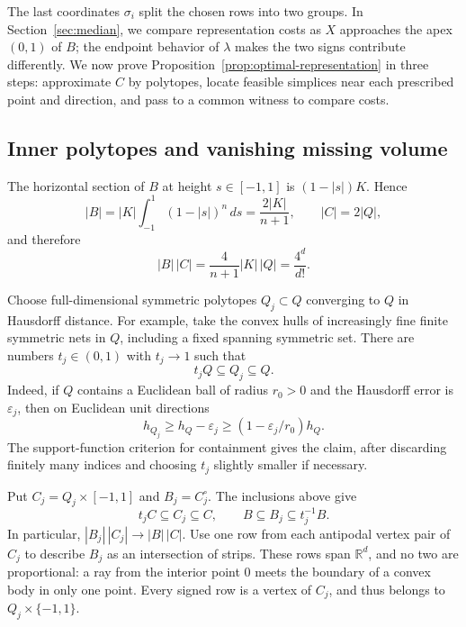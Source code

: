 The last coordinates $\sigma_i$ split the chosen rows into two groups.
In Section~\ref{sec:median}, we compare representation costs as $X$ approaches
the apex $(0,1)$ of $B$; the endpoint behavior of $\lambda$ makes the
two signs contribute differently. We now prove
Proposition~\ref{prop:optimal-representation} in three steps: approximate
$C$ by polytopes, locate feasible simplices near each prescribed point
and direction, and pass to a common witness to compare costs.

\subsection{Inner polytopes and vanishing missing volume}

The horizontal section of $B$ at height $s\in[-1,1]$ is
$(1-|s|)K$. Hence
\[
 |B|=|K|\int_{-1}^1(1-|s|)^n\,ds
     =\frac{2|K|}{n+1},
 \qquad |C|=2|Q|,
\]
and therefore
\begin{equation}\label{eq:lift-equality}
 |B|\,|C|=\frac4{n+1}|K|\,|Q|=\frac{4^d}{d!}.
\end{equation}

Choose full-dimensional symmetric polytopes $Q_j\subset Q$
converging to $Q$ in Hausdorff distance. For example, take the convex
hulls of increasingly fine finite symmetric nets in $Q$, including
a fixed spanning symmetric set. There are numbers $t_j\in(0,1)$
with $t_j\to1$ such that
\[
 t_jQ\subseteq Q_j\subseteq Q.
\]
Indeed, if $Q$ contains a Euclidean ball of radius $r_0>0$ and the
Hausdorff error is $\varepsilon_j$, then on Euclidean unit directions
\[
 h_{Q_j}\ge h_Q-\varepsilon_j
          \ge (1-\varepsilon_j/r_0)h_Q.
\]
The support-function criterion for containment gives the claim,
after discarding finitely many indices and choosing $t_j$ slightly
smaller if necessary.

Put $C_j=Q_j\times[-1,1]$ and $B_j=C_j^\circ$. The inclusions above
give
\begin{equation}\label{eq:lift-sandwich}
 t_jC\subseteq C_j\subseteq C,
 \qquad
 B\subseteq B_j\subseteq t_j^{-1}B.
\end{equation}
In particular, $|B_j|\,|C_j|\to|B|\,|C|$.
Use one row from each antipodal vertex pair of $C_j$ to describe $B_j$
as an intersection of strips. These rows span $\mathbb R^d$, and
no two are proportional: a ray from the interior point $0$ meets the
boundary of a convex body in only one point. Every signed row is a
vertex of $C_j$, and thus belongs to $Q_j\times\{-1,1\}$.

